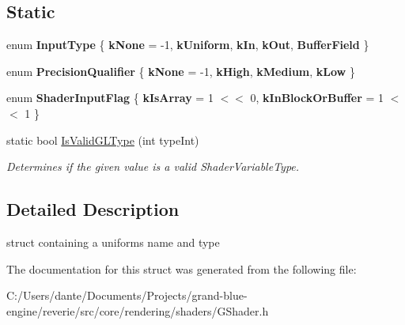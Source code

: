 \subsection*{Static}
\begin{DoxyCompactItemize}
\item 
\mbox{\label{structrev_1_1_shader_input_info_a29a34d46b94617505904bf50ffccb72e}} 
enum {\bfseries Input\+Type} \{ \newline
{\bfseries k\+None} = -\/1, 
{\bfseries k\+Uniform}, 
{\bfseries k\+In}, 
{\bfseries k\+Out}, 
\newline
{\bfseries Buffer\+Field}
 \}
\item 
\mbox{\label{structrev_1_1_shader_input_info_a66d85b80da1c85d109c7231bff7621cd}} 
enum {\bfseries Precision\+Qualifier} \{ {\bfseries k\+None} = -\/1, 
{\bfseries k\+High}, 
{\bfseries k\+Medium}, 
{\bfseries k\+Low}
 \}
\item 
\mbox{\label{structrev_1_1_shader_input_info_a2292bc0024d72d229b5170a3e1c0eed7}} 
enum {\bfseries Shader\+Input\+Flag} \{ {\bfseries k\+Is\+Array} = 1 $<$$<$ 0, 
{\bfseries k\+In\+Block\+Or\+Buffer} = 1 $<$$<$ 1
 \}
\item 
\mbox{\label{structrev_1_1_shader_input_info_ad9e4eed81be0a33e736e3e8d117b4add}} 
static bool \mbox{\hyperlink{structrev_1_1_shader_input_info_ad9e4eed81be0a33e736e3e8d117b4add}{Is\+Valid\+G\+L\+Type}} (int type\+Int)
\begin{DoxyCompactList}\small\item\em Determines if the given value is a valid Shader\+Variable\+Type. \end{DoxyCompactList}\end{DoxyCompactItemize}


\subsection{Detailed Description}
struct containing a uniform\textquotesingle{}s name and type 

The documentation for this struct was generated from the following file\+:\begin{DoxyCompactItemize}
\item 
C\+:/\+Users/dante/\+Documents/\+Projects/grand-\/blue-\/engine/reverie/src/core/rendering/shaders/G\+Shader.\+h\end{DoxyCompactItemize}
